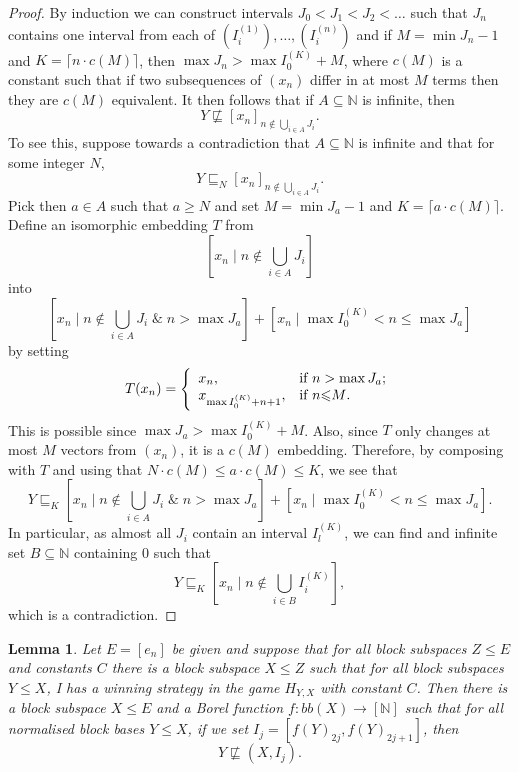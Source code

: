 \documentclass[10pt]{amsart}
\numberwithin{equation}{section}
\newtheorem{lemme}[thm]{Lemma}
\begin{document}
\begin{proof}
By induction we can  construct intervals $J_0<J_1<J_2<\ldots$ such that $J_n$
contains one interval from each of $(I^{(1)}_i), \ldots , (I^{(n)}_i)$ and if
$M=\min J_n-1$ and $K=\lceil n\cdot c(M)\rceil$, then $\max J_n>\max
I^{(K)}_0+M$, where $c(M)$ is a constant such that if two subsequences of
$(x_n)$ differ in at most $M$ terms then they are $c(M)$ equivalent. It then
follows that if $A\subseteq {\mathbb N}$ is infinite, then
$$
Y\not\sqsubseteq [x_n]_{n\notin \bigcup_{i\in A}J_i}.
$$
To see this, suppose towards a contradiction that $A\subseteq {\mathbb N}$ is infinite and that for some integer $N$,
$$
Y\sqsubseteq_N  [x_n]_{n\notin \bigcup_{i\in A}J_i}.
$$
Pick then $a\in A$ such that $a{\ensuremath{\geqslant}} N$ and set $M=\min J_a-1$ and $K=\lceil
a\cdot c(M)\rceil$. Define an isomorphic embedding $T$ from
$$
[x_n{ \; \big| \;} n\notin \bigcup_{i\in A}J_i]
$$
into
$$
[x_n{ \; \big| \;} n\notin \bigcup_{i\in A}J_i\;\&\; n>\max J_a]+[x_n{ \; \big| \;} \max I_0^{(K)}<n{\ensuremath{\leqslant}} \max J_a ]
$$
by setting
$$
T(x_n)=\left\{
                                \begin{array}{ll}
                                  x_n, & \hbox{if $n>\max J_a$;} \\
                                  x_{\max I_0^{(K)}+n+1}, & \hbox{if $n{\ensuremath{\leqslant}} M$.}
                                \end{array}
                              \right.
$$
This is possible since $\max J_a>\max I^{(K)}_0+M$. Also, since $T$ only
changes at most $M$ vectors from $(x_n)$, it is a $c(M)$ embedding. Therefore,
by composing with $T$ and using that $N\cdot c(M){\ensuremath{\leqslant}} a\cdot c(M){\ensuremath{\leqslant}} K$, we
see that
$$
Y\sqsubseteq_K [x_n{ \; \big| \;} n\notin \bigcup_{i\in A}J_i\;\&\; n>\max J_a]+[x_n{ \; \big| \;} \max I_0^{(K)}<n{\ensuremath{\leqslant}} \max J_a].
$$
In particular, as almost all $J_i$ contain an interval $I_l^{(K)}$, we can find
and infinite set $B\subseteq {\mathbb N}$ containing $0$ such that
$$
Y\sqsubseteq_K [x_n{ \; \big| \;} n\notin \bigcup_{i\in B}I^{(K)}_i],
$$
which is a contradiction.
\end{proof}

\begin{lemme}\label{borel tight}
Let $E=[e_n]$ be given and suppose that for all block subspaces $Z{\ensuremath{\leqslant}} E$ and
constants $C$ there is a block subspace $X{\ensuremath{\leqslant}} Z$ such that for all block
subspaces $Y{\ensuremath{\leqslant}} X$, I has a winning strategy in the game $H_{Y,X}$ with
constant $C$. Then there is a block subspace $X{\ensuremath{\leqslant}} E$ and a Borel function
$f\colon bb(X){\rightarrow} [{\mathbb N}]$ such that for all normalised block bases $Y{\ensuremath{\leqslant}} X$, if
we set $I_j=[f(Y)_{2j},f(Y)_{2j+1}]$, then
$$
Y\not\sqsubseteq (X,I_j).
$$
\end{lemme}
\end{document}
